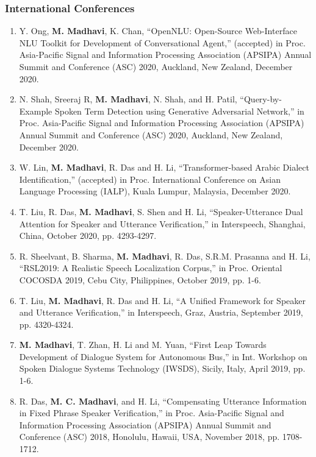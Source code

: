 \documentclass[10pt]{article}
\begin{document}
\subsubsection*{International Conferences}
\begin{enumerate}[resume]
				\setlength\itemsep{-0.05em}

\item Y. Ong, \textbf{M. Madhavi}, K. Chan, ``OpenNLU: Open-Source Web-Interface NLU Toolkit for Development of Conversational Agent,'' (accepted) in Proc. Asia-Pacific Signal and Information Processing Association (APSIPA) Annual Summit and Conference (ASC) 2020, Auckland, New Zealand, December 2020.

\item N. Shah, Sreeraj R, \textbf{M. Madhavi}, N. Shah, and H. Patil, ``Query-by-Example Spoken Term Detection using Generative Adversarial Network,'' in Proc. Asia-Pacific Signal and Information Processing Association (APSIPA) Annual Summit and Conference (ASC) 2020, Auckland, New Zealand, December 2020.


\item W. Lin, \textbf{M. Madhavi}, R. Das and H. Li, ``Transformer-based Arabic Dialect Identification,'' (accepted) in Proc. International Conference on Asian Language Processing (IALP), Kuala Lumpur, Malaysia, December 2020.

\item T. Liu, R. Das, \textbf{M. Madhavi}, S. Shen and H. Li, ``Speaker-Utterance Dual Attention for Speaker and Utterance Verification,''  in Interspeech, Shanghai, China, October 2020, pp. 4293-4297.

\item R. Sheelvant, B. Sharma, \textbf{M. Madhavi}, R. Das, S.R.M. Prasanna and H. Li, ``RSL2019: A Realistic Speech Localization Corpus,'' in Proc. Oriental COCOSDA 2019, Cebu City, Philippines, October 2019, pp. 1-6.

\item T. Liu, \textbf{M. Madhavi}, R. Das and H. Li, ``A Unified Framework for Speaker and Utterance Verification,'' in Interspeech, Graz, Austria, September 2019, pp. 4320-4324.

				
\item \textbf{M. Madhavi}, T. Zhan, H. Li and M. Yuan, ``First Leap Towards Development of Dialogue System for Autonomous Bus,'' in Int. Workshop on Spoken Dialogue Systems Technology (IWSDS),  Sicily, Italy, April 2019, pp. 1-6.

\item R. Das, \textbf{M. C. Madhavi}, and H. Li, ``Compensating Utterance Information in Fixed Phrase Speaker Verification,'' in Proc. Asia-Pacific Signal and Information Processing Association (APSIPA) Annual Summit and Conference (ASC) 2018, Honolulu, Hawaii, USA, November 2018, pp. 1708-1712.
				

\end{enumerate}
\end{document}
